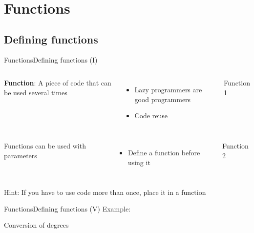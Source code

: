 \documentclass[10pt,compress]{beamer} %
\begin{document}
\section{Functions}
\subsection{Defining functions}
\begin{frame}{Functions}{Defining functions (I)}
    \begin{columns}
	\textbf{Function}: A piece of code that can be used several times
		\begin{itemize}
		\item Lazy programmers are good programmers
		\item Code reuse
		\end{itemize}
		\begin{block}{Function 1}
		\vspace{-0.2cm}
		
		\vspace{-0.2cm}
		\end{block}
	\end{columns}

    \begin{columns}
	Functions can be used with parameters
		\begin{itemize}
		\item Define a function before using it
		\end{itemize}

		\begin{block}{Function 2}
		\vspace{-0.2cm}
		
		\vspace{-0.2cm}
		\end{block}
	\end{columns}
	\bigskip
	\centering \alert{Hint: If you have to use code more than once, place it in a function}
\end{frame}


\begin{frame}{Functions}{Defining functions (V)}
Example:
    
		\begin{block}{Conversion of degrees}
		\vspace{-0.2cm}
		
		\vspace{-0.2cm}
		\end{block}

\end{frame}
\end{document}
